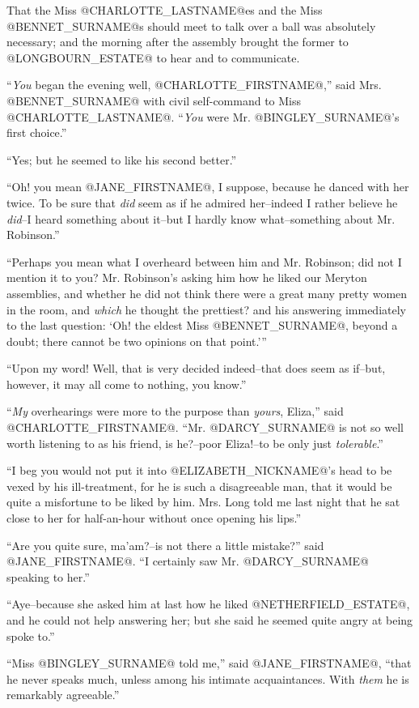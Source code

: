 That the Miss @CHARLOTTE_LASTNAME@es and the Miss @BENNET_SURNAME@s should meet to talk over
a ball was absolutely necessary; and the morning after the assembly
brought the former to @LONGBOURN_ESTATE@ to hear and to communicate.

``\textit{You} began the evening well, @CHARLOTTE_FIRSTNAME@,'' said Mrs. @BENNET_SURNAME@ with civil
self-command to Miss @CHARLOTTE_LASTNAME@. ``\textit{You} were Mr. @BINGLEY_SURNAME@'s first choice.''

``Yes; but he seemed to like his second better.''

``Oh! you mean @JANE_FIRSTNAME@, I suppose, because he danced with her twice. To be
sure that \textit{did} seem as if he admired her--indeed I rather believe he
\textit{did}--I heard something about it--but I hardly know what--something
about Mr. Robinson.''

``Perhaps you mean what I overheard between him and Mr. Robinson; did not
I mention it to you? Mr. Robinson's asking him how he liked our Meryton
assemblies, and whether he did not think there were a great many
pretty women in the room, and \textit{which} he thought the prettiest? and his
answering immediately to the last question: `Oh! the eldest Miss @BENNET_SURNAME@,
beyond a doubt; there cannot be two opinions on that point.'''

``Upon my word! Well, that is very decided indeed--that does seem as
if--but, however, it may all come to nothing, you know.''

``\textit{My} overhearings were more to the purpose than \textit{yours}, Eliza,'' said
@CHARLOTTE_FIRSTNAME@. ``Mr. @DARCY_SURNAME@ is not so well worth listening to as his friend,
is he?--poor Eliza!--to be only just \textit{tolerable}.''

``I beg you would not put it into @ELIZABETH_NICKNAME@'s head to be vexed by his
ill-treatment, for he is such a disagreeable man, that it would be quite
a misfortune to be liked by him. Mrs. Long told me last night that he
sat close to her for half-an-hour without once opening his lips.''

``Are you quite sure, ma'am?--is not there a little mistake?'' said @JANE_FIRSTNAME@.
``I certainly saw Mr. @DARCY_SURNAME@ speaking to her.''

``Aye--because she asked him at last how he liked @NETHERFIELD_ESTATE@, and he
could not help answering her; but she said he seemed quite angry at
being spoke to.''

``Miss @BINGLEY_SURNAME@ told me,'' said @JANE_FIRSTNAME@, ``that he never speaks much,
unless among his intimate acquaintances. With \textit{them} he is remarkably
agreeable.''

